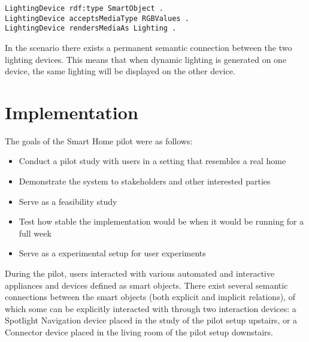 \begin{verbatim}
LightingDevice rdf:type SmartObject .
LightingDevice acceptsMediaType RGBValues .
LightingDevice rendersMediaAs Lighting .
\end{verbatim}

In the scenario there exists a permanent semantic connection between the two lighting devices. This means that when dynamic lighting is generated on one device, the same lighting will be displayed on the other device.




\section{Implementation}
\label{D2Implementation}

The goals of the Smart Home pilot were as follows:

\begin{itemize}
	\item Conduct a pilot study with users in a setting that resembles a real home
	\item Demonstrate the system to stakeholders and other interested parties
	\item Serve as a feasibility study
	\item Test how stable the implementation would be when it would be running for a full week
	\item Serve as a experimental setup for user experiments
\end{itemize}


During the pilot, users interacted with various automated and interactive appliances and devices defined as smart objects. There exist several semantic connections between the smart objects (both explicit and implicit relations), of which some can be explicitly interacted with through two interaction devices: a Spotlight Navigation device placed in the study of the pilot setup upstairs, or a Connector device placed in the living room of the pilot setup downstairs. 

